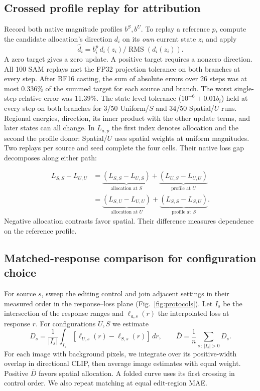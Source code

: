 \documentclass[10pt,doubleanonymous]{ieeeconf}
\newcommand{\RMS}{\operatorname{RMS}}
\begin{document}
\subsection{Crossed profile replay for attribution}
Record both native magnitude profiles $b^S,b^U$. To replay a reference $p$, compute the candidate allocation's direction $d_i$ on its \emph{own} current state $z_i$ and apply
\begin{equation}
   \widehat d_i=b_i^p\,d_i(z_i)/\RMS(d_i(z_i)).
\label{eq:replay}
\end{equation}
A zero target gives a zero update. A positive target requires a nonzero direction. All 100 SAM replays met the FP32 projection tolerance on both branches at every step. After BF16 casting, the sum of absolute errors over 26 steps was at most 0.336\% of the summed target for each source and branch. The worst single-step relative error was 11.39\%. The state-level tolerance ($10^{-6}+0.01b_i$) held at every step on both branches for 3/50 Uniform/$S$ and 34/50 Spatial/$U$ runs. Regional energies, direction, its inner product with the other update terms, and later states can all change. In $L_{a,p}$ the first index denotes allocation and the second the profile donor: Spatial/$U$ uses spatial weights at uniform magnitudes. Two replays per source and seed complete the four cells. Their native loss gap decomposes along either path:

\begin{align}
L_{S,S}-L_{U,U}
&=\underbrace{(L_{S,S}-L_{U,S})}_{\text{allocation at }S}
  +\underbrace{(L_{U,S}-L_{U,U})}_{\text{profile at }U} \nonumber\\
&=\underbrace{(L_{S,U}-L_{U,U})}_{\text{allocation at }U}
  +\underbrace{(L_{S,S}-L_{S,U})}_{\text{profile at }S}.
\label{eq:paths}
\end{align}
Negative allocation contrasts favor spatial. Their difference measures dependence on the reference profile.

\subsection{Matched-response comparison for configuration choice}
For source $s$, sweep the editing control and join adjacent settings in their measured order in the response--loss plane (Fig.~\ref{fig:protocols}). Let $I_s$ be the intersection of the response ranges and $\ell_{a,s}(r)$ the interpolated loss at response $r$. For configurations $U,S$ we estimate
\begin{equation}
D_s=\frac{1}{|I_s|}\int_{I_s}
       [\ell_{U,s}(r)-\ell_{S,s}(r)]\,dr,\qquad
\overline D=\frac{1}{n}\sum_{s\,:\,|I_s|>0}D_s .
\label{eq:mrc}
\end{equation}
For each image with background pixels, we integrate over its positive-width overlap in directional CLIP, then average image estimates with equal weight. Positive $\overline D$ favors spatial allocation. A folded curve uses its first crossing in control order. We also repeat matching at equal edit-region MAE.
\end{document}
